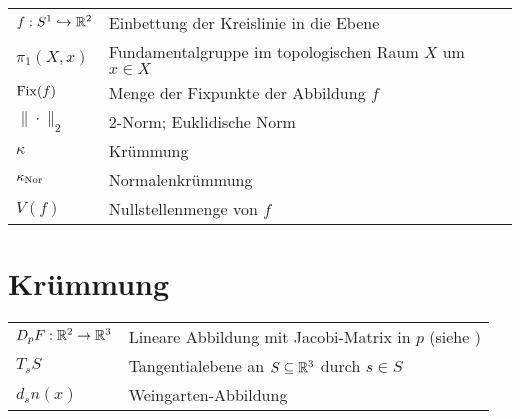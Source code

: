 \settowidth{}
\setlength\mylengthb{\dimexpr\columnwidth-\mylengtha-2\tabcolsep\relax}

\begin{xtabular}{@{} p{\mylengtha} P{\mylengthb} @{}}
$f:S^1 \hookrightarrow \mathbb{R}^2$& Einbettung der Kreislinie in die Ebene\\
$\pi_1(X,x)$                  & Fundamentalgruppe im topologischen Raum $X$ um $x \in X$\\
$\operatorname{Fix}(f)$                     & Menge der Fixpunkte der Abbildung $f$\\
$\|\cdot\|_2$                 & 2-Norm; Euklidische Norm\\
$\kappa$                      & Krümmung\\
$\kappa_{\textnormal{Nor}}$           & Normalenkrümmung\\
$V(f)$                        & Nullstellenmenge von $f$\footnotemark
\end{xtabular}
\section*{Krümmung}

\settowidth{}
\setlength\mylengthb{\dimexpr\columnwidth-\mylengtha-2\tabcolsep\relax}

\begin{xtabular}{@{} p{\mylengtha} P{\mylengthb} @{}}
$D_p F: \mathbb{R}^2 \rightarrow \mathbb{R}^3$& Lineare Abbildung mit Jacobi-Matrix in $p$ (siehe )\\
$T_s S$                           & Tangentialebene an $S \subseteq \mathbb{R}^3$ durch $s \in S$\\
$d_s n(x)$                        & Weingarten-Abbildung\\
\end{xtabular}

